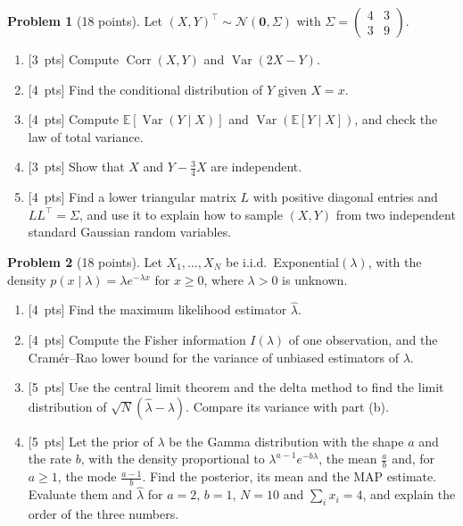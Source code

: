 \documentclass[11pt]{article}
\theoremstyle{definition}
\newtheorem{problem}{Problem}
\newcommand{\pts}[1]{\textup{[#1~pts]}}
\newcommand{\E}{\mathbb{E}}
\DeclareMathOperator{\Var}{Var}
\DeclareMathOperator{\Corr}{Corr}
\begin{document}
\begin{problem}[18 points]\label{pr:fin-gaussian}
    Let $(X, Y)^\top \sim \mathcal{N}(\mathbf{0}, \Sigma)$ with $\Sigma = \begin{pmatrix} 4 & 3 \\ 3 & 9 \end{pmatrix}$.
    \begin{enumerate}[label=(\alph*)]
        \item \pts{3} Compute $\Corr(X, Y)$ and $\Var(2X - Y)$.
        \item \pts{4} Find the conditional distribution of $Y$ given $X = x$.
        \item \pts{4} Compute $\E[\Var(Y \mid X)]$ and $\Var(\E[Y \mid X])$, and check the law of total variance.
        \item \pts{3} Show that $X$ and $Y - \frac{3}{4}X$ are independent.
        \item \pts{4} Find a lower triangular matrix $L$ with positive diagonal entries and $LL^\top = \Sigma$, and use it to explain how to sample $(X, Y)$ from two independent standard Gaussian random variables.
    \end{enumerate}
\end{problem}

\begin{problem}[18 points]\label{pr:fin-estimation}
    Let $X_1, \ldots, X_N$ be i.i.d.\ Exponential$(\lambda)$, with the density $p(x \mid \lambda) = \lambda e^{-\lambda x}$ for $x \geq 0$, where $\lambda > 0$ is unknown.
    \begin{enumerate}[label=(\alph*)]
        \item \pts{4} Find the maximum likelihood estimator $\hat\lambda$.
        \item \pts{4} Compute the Fisher information $I(\lambda)$ of one observation, and the Cram\'er--Rao lower bound for the variance of unbiased estimators of $\lambda$.
        \item \pts{5} Use the central limit theorem and the delta method to find the limit distribution of $\sqrt{N}(\hat\lambda - \lambda)$. Compare its variance with part (b).
        \item \pts{5} Let the prior of $\lambda$ be the Gamma distribution with the shape $a$ and the rate $b$, with the density proportional to $\lambda^{a-1}e^{-b\lambda}$, the mean $\frac{a}{b}$ and, for $a \geq 1$, the mode $\frac{a - 1}{b}$. Find the posterior, its mean and the MAP estimate. Evaluate them and $\hat\lambda$ for $a = 2$, $b = 1$, $N = 10$ and $\sum_i x_i = 4$, and explain the order of the three numbers.
    \end{enumerate}
\end{problem}
\end{document}
